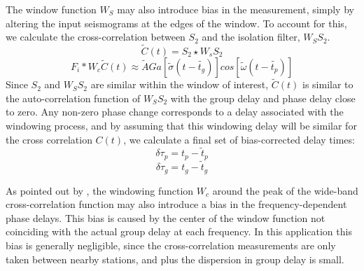 The window function $W_S$ may also introduce bias in the measurement, simply by altering the input seismograms at the edges of the window.  To account for this, we calculate the cross-correlation between $S_2$ and the isolation filter, $W_SS_2$.
\begin{equation}
	\tilde{C}(t) = S_2 \star W_sS_2
\end{equation}
\begin{equation}
	F_i \ast W_c \tilde{C}(t) \approx \tilde{A} Ga [\tilde{\sigma}(t-\tilde{t_g})]cos[\tilde{\omega}(t-\tilde{t_p})]
\end{equation}
Since $S_2$ and $W_SS_2$ are similar within the window of interest, $\tilde{C}(t)$ is similar to the auto-correlation function of $W_S S_2$ with the group delay and phase delay close to zero. Any non-zero phase change corresponds to a delay associated with the windowing process, and by assuming that this windowing delay will be similar for the cross correlation $C(t)$, we calculate a final set of bias-corrected delay times:
\begin{equation}
	\delta \tau_p = t_p - \tilde{t}_p 
\end{equation}
\begin{equation}
	\delta \tau_g = t_g - \tilde{t}_g
\end{equation}

As pointed out by \citet{Gee:1992ww}, the windowing function $W_c$ around the peak of the wide-band cross-correlation function may also introduce a bias in the frequency-dependent phase delays. This bias is caused by the center of the window function not coinciding with the actual group delay at each frequency. 
In this application this bias is generally negligible, since the cross-correlation measurements are only taken between nearby stations, and plus the dispersion in group delay is small. 

